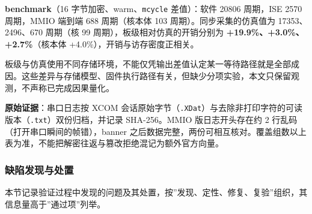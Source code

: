 \textbf{benchmark}（16 字节加密、warm、\texttt{mcycle} 差值）：软件 20806 周期，ISE 2570 周期，MMIO 端到端 688 周期（核本体 103 周期）。同步采集的仿真值为 17353、2496、670 周期（核 99 周期），板级相对仿真的开销分别为 \textbf{+19.9\%、+3.0\%、+2.7\%}（核本体 +4.0\%），开销与访存密度正相关。

板级与仿真使用不同存储环境，不能仅凭输出差值认定某一等待路径就是全部成因。这些差异与存储模型、固件执行路径有关，但缺少分项实验，本文只保留观测，不声称已完成因果量化。

\textbf{原始证据}：串口日志按 XCOM 会话原始字节（\texttt{.\allowbreak{}XDat}）与去除非打印字符的可读版本（\texttt{.\allowbreak{}txt}）双份归档，并记录 SHA-256。MMIO 版日志开头存在约 2 行乱码（打开串口瞬间的帧错），banner 之后数据完整，两份可相互核对。覆盖组数以上表为准，不能把解密往返与篡改拒绝混记为额外官方向量。


\Needspace{85pt}

\subsubsection{缺陷发现与处置}

本节记录验证过程中发现的问题及其处置，按''发现、定性、修复、复验''组织，其信息量高于''通过项''列举。

